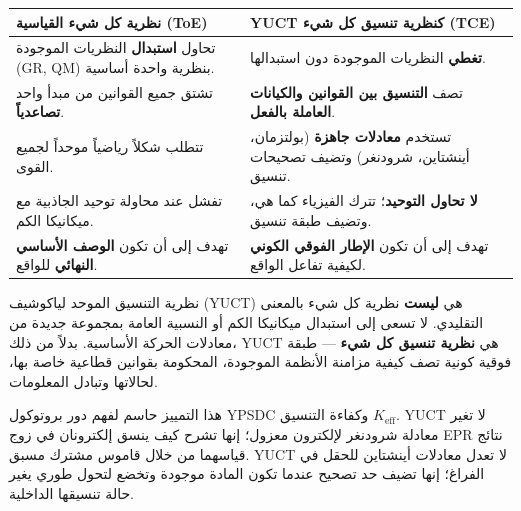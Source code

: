 \documentclass[11pt,a4paper]{article}
\begin{document}
	\begin{tcolorbox}[title=YUCT مقابل نظريات كل شيء القياسية (ToE), 
		colback=blue!5!white, colframe=blue!50!black, 
		fonttitle=\bfseries, sharp corners]
		\small
		\begin{english}
			\begin{table}[H]
				\centering
				\begin{tabular}{p{0.45\textwidth} p{}}
					\toprule
					\textbf{نظرية كل شيء القياسية (ToE)} & \textbf{YUCT كنظرية تنسيق كل شيء (TCE)} \\
					\midrule
					تحاول \textbf{استبدال} النظريات الموجودة (GR, QM) بنظرية واحدة أساسية. & \textbf{تغطي} النظريات الموجودة دون استبدالها. \\
					\addlinespace
					تشتق جميع القوانين من مبدأ واحد \textbf{تصاعدياً}. & تصف \textbf{التنسيق بين القوانين والكيانات العاملة بالفعل}. \\
					\addlinespace
					تتطلب شكلاً رياضياً موحداً لجميع القوى. & تستخدم \textbf{معادلات جاهزة} (بولتزمان، أينشتاين، شرودنغر) وتضيف تصحيحات تنسيق. \\
					\addlinespace
					تفشل عند محاولة توحيد الجاذبية مع ميكانيكا الكم. & \textbf{لا تحاول التوحيد}؛ تترك الفيزياء كما هي، وتضيف طبقة تنسيق. \\
					\addlinespace
					تهدف إلى أن تكون \textbf{الوصف الأساسي النهائي} للواقع. & تهدف إلى أن تكون \textbf{الإطار الفوقي الكوني} لكيفية تفاعل الواقع. \\
					\bottomrule
				\end{tabular}
			\end{table}
		\end{english}
	\end{tcolorbox}
	
	\vspace{0.5cm}
	\noindent
	نظرية التنسيق الموحد لياكوشيف (YUCT) هي \textbf{ليست} نظرية كل شيء بالمعنى التقليدي. لا تسعى إلى استبدال ميكانيكا الكم أو النسبية العامة بمجموعة جديدة من معادلات الحركة الأساسية. بدلاً من ذلك، YUCT هي \textbf{نظرية تنسيق كل شيء} — طبقة فوقية كونية تصف كيفية مزامنة الأنظمة الموجودة، المحكومة بقوانين قطاعية خاصة بها، لحالاتها وتبادل المعلومات.
	
	هذا التمييز حاسم لفهم دور بروتوكول YPSDC وكفاءة التنسيق $K_{\mathrm{eff}}$. YUCT لا تغير معادلة شرودنغر لإلكترون معزول؛ إنها تشرح كيف ينسق إلكترونان في زوج EPR نتائج قياسهما من خلال قاموس مشترك مسبق. YUCT لا تعدل معادلات أينشتاين للحقل في الفراغ؛ إنها تضيف حد تصحيح عندما تكون المادة موجودة وتخضع لتحول طوري يغير حالة تنسيقها الداخلية.
	
\end{document}
